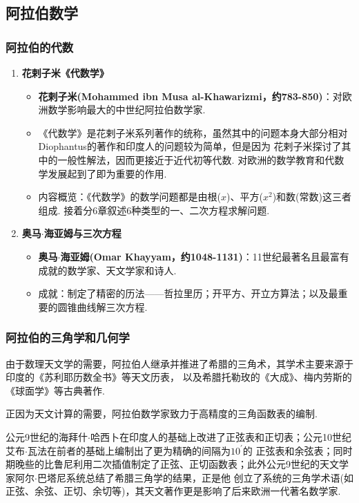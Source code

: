 \documentclass{Math_Note}
\begin{document}
\subsection{阿拉伯数学}
\subsubsection{阿拉伯的代数}
\begin{enumerate}
    \item \textbf{花剌子米《代数学》}
    \begin{itemize}
        \item \textbf{花剌子米(Mohammed ibn Musa al-Khawarizmi，约783-850)}：对欧洲数学影响最大的中世纪阿拉伯数学家.
        \item 《代数学》是花剌子米系列著作的统称，虽然其中的问题本身大部分相对Diophantus的著作和印度人的问题较为简单，但是因为
        花剌子米探讨了其中的一般性解法，因而更接近于近代初等代数. 对欧洲的数学教育和代数学发展起到了即为重要的作用. 
        \item 内容概览：《代数学》的数学问题都是由根($x$)、平方($x^{2}$)和数(常数)这三者组成. 接着分6章叙述6种类型的一、二次方程求解问题.
    \end{itemize}
    \item \textbf{奥马$\cdot$海亚姆与三次方程}
    \begin{itemize}
        \item \textbf{奥马$\cdot$海亚姆(Omar Khayyam，约1048-1131)}：11世纪最著名且最富有成就的数学家、天文学家和诗人. 
        \item 成就：制定了精密的历法——哲拉里历；开平方、开立方算法；以及最重要的圆锥曲线解三次方程. 
    \end{itemize}
\end{enumerate}

\subsubsection{阿拉伯的三角学和几何学}
由于数理天文学的需要，阿拉伯人继承并推进了希腊的三角术，其学术主要来源于印度的《苏利耶历数全书》等天文历表，
以及希腊托勒玫的《大成》、梅内劳斯的《球面学》等古典著作. 

正因为天文计算的需要，阿拉伯数学家致力于高精度的三角函数表的编制.

公元9世纪的海拜什$\cdot$哈西卜在印度人的基础上改进了正弦表和正切表；公元10世纪艾布$\cdot$瓦法在前者的基础上编制出了更为精确的间隔为$10^{'}$的
正弦表和余弦表；同时期晚些的比鲁尼利用二次插值制定了正弦、正切函数表；此外公元9世纪的天文学家阿尔$\cdot$巴塔尼系统总结了希腊三角学的结果，正是他
创立了系统的三角学术语(如正弦、余弦、正切、余切等)，其天文著作更是影响了后来欧洲一代著名数学家.
\end{document}
